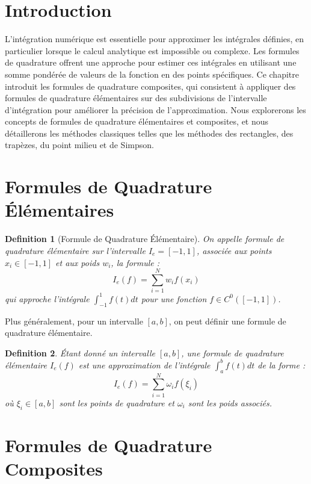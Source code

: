 \documentclass{article}
\newtheorem{definition}{Definition}
\begin{document}
\sloppy

\section{Introduction}

L'intégration numérique est essentielle pour approximer les intégrales définies, en particulier lorsque le calcul analytique est impossible ou complexe. Les formules de quadrature offrent une approche pour estimer ces intégrales en utilisant une somme pondérée de valeurs de la fonction en des points spécifiques. Ce chapitre introduit les formules de quadrature composites, qui consistent à appliquer des formules de quadrature élémentaires sur des subdivisions de l'intervalle d'intégration pour améliorer la précision de l'approximation. Nous explorerons les concepts de formules de quadrature élémentaires et composites, et nous détaillerons les méthodes classiques telles que les méthodes des rectangles, des trapèzes, du point milieu et de Simpson.

\section{Formules de Quadrature Élémentaires}

\begin{definition}[Formule de Quadrature Élémentaire]
On appelle formule de quadrature élémentaire sur l'intervalle $I_e = [-1, 1]$, associée aux points $x_i \in [-1, 1]$ et aux poids $w_i$, la formule :
\[ I_e(f) = \sum_{i=1}^{N} w_i f(x_i) \]
qui approche l'intégrale $\int_{-1}^{1} f(t) dt$ pour une fonction $f \in C^0([-1, 1])$.
\end{definition}

Plus généralement, pour un intervalle $[a, b]$, on peut définir une formule de quadrature élémentaire.

\begin{definition}
Étant donné un intervalle $[a, b]$, une formule de quadrature élémentaire $I_e(f)$ est une approximation de l'intégrale $\int_{a}^{b} f(t) dt$ de la forme :
\[ I_e(f) = \sum_{i=1}^{N} \omega_i f(\xi_i) \]
où $\xi_i \in [a, b]$ sont les points de quadrature et $\omega_i$ sont les poids associés.
\end{definition}

\section{Formules de Quadrature Composites}
\end{document}
